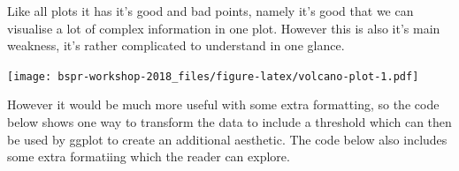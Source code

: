 \documentclass[12pt,]{book}
\newenvironment{Shaded}{\begin{snugshade}}{\end{snugshade}}
\newcommand{\KeywordTok}[1]{\textcolor[rgb]{0.13,0.29,0.53}{\textbf{#1}}}
\newcommand{\StringTok}[1]{\textcolor[rgb]{0.31,0.60,0.02}{#1}}
\newcommand{\OperatorTok}[1]{\textcolor[rgb]{0.81,0.36,0.00}{\textbf{#1}}}
\newcommand{\NormalTok}[1]{#1}
\theoremstyle{definition}
\theoremstyle{definition}
\theoremstyle{definition}
\theoremstyle{remark}
\begin{document}
Like all plots it has it's good and bad points, namely it's good that we
can visualise a lot of complex information in one plot. However this is
also it's main weakness, it's rather complicated to understand in one
glance.

\begin{Shaded}
\end{Shaded}

\texttt{[image: bspr-workshop-2018\_files/figure-latex/volcano-plot-1.pdf]}

However it would be much more useful with some extra formatting, so the
code below shows one way to transform the data to include a threshold
which can then be used by ggplot to create an additional aesthetic. The
code below also includes some extra formatiing which the reader can
explore.
\end{document}
